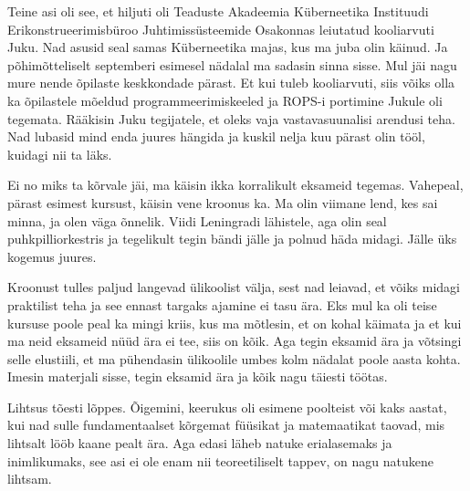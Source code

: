 Teine asi oli see, et  hiljuti oli Teaduste Akadeemia Küberneetika Instituudi 
Erikonstrueerimisbüroo Juhtimissüsteemide Osakonnas 
leiutatud kooliarvuti Juku. Nad asusid seal 
samas Küberneetika majas, kus ma juba olin käinud. Ja põhimõtteliselt 
septemberi esimesel nädalal ma sadasin sinna sisse. Mul jäi nagu mure nende 
õpilaste keskkondade pärast. Et kui tuleb kooliarvuti, siis võiks olla ka  
õpilastele mõeldud programmeerimiskeeled ja ROPS-i portimine 
Jukule oli tegemata. Rääkisin Juku tegijatele, et oleks vaja  vastavasuunalisi 
arendusi teha. Nad lubasid mind enda juures hängida ja kuskil nelja kuu pärast 
olin tööl, kuidagi nii ta läks. 


Ei no miks ta kõrvale jäi, ma käisin ikka korralikult eksameid tegemas. 
Vahepeal, pärast esimest kursust, käisin vene kroonus ka.  Ma olin viimane 
lend, kes sai minna, ja olen väga õnnelik. Viidi Leningradi lähistele, aga olin 
seal puhkpilliorkestris ja tegelikult tegin bändi jälle ja polnud häda midagi. 
Jälle üks kogemus juures. 

Kroonust tulles paljud langevad ülikoolist välja, sest nad leiavad, et võiks 
midagi praktilist teha ja see ennast targaks ajamine ei tasu ära. Eks mul ka 
oli teise kursuse poole peal ka mingi kriis, kus ma mõtlesin, et on kohal 
käimata ja et kui ma neid eksameid nüüd ära ei tee, siis on kõik. Aga tegin 
eksamid ära ja  võtsingi selle elustiili, et ma pühendasin ülikoolile umbes 
kolm nädalat poole aasta kohta. Imesin materjali sisse, tegin eksamid ära ja 
kõik nagu täiesti töötas. 


Lihtsus tõesti lõppes. Õigemini, keerukus oli esimene poolteist või kaks  
aastat,  kui nad sulle fundamentaalset kõrgemat füüsikat ja matemaatikat 
taovad, mis lihtsalt lööb kaane pealt ära. Aga edasi läheb natuke erialasemaks 
ja inimlikumaks, see asi ei ole enam nii teoreetiliselt tappev, on nagu 
natukene lihtsam. 


